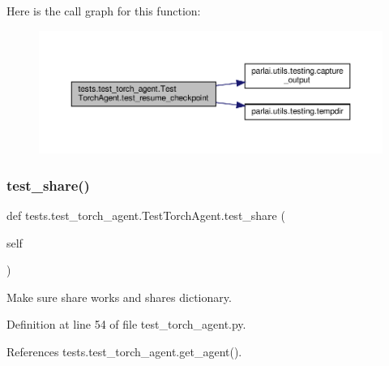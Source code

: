 Here is the call graph for this function\+:
\nopagebreak
\begin{figure}[H]
\begin{center}
\leavevmode
\includegraphics[width=350pt]{classtests_1_1test__torch__agent_1_1TestTorchAgent_a7135ee3421b1d0fc98f0202718910482_cgraph}
\end{center}
\end{figure}
\mbox{\label{classtests_1_1test__torch__agent_1_1TestTorchAgent_af3d1c7681a30a06684117464ccefb15d}} 
\subsubsection{\texorpdfstring{test\+\_\+share()}{test\_share()}}
{\footnotesize\ttfamily def tests.\+test\+\_\+torch\+\_\+agent.\+Test\+Torch\+Agent.\+test\+\_\+share (\begin{DoxyParamCaption}\item[{}]{self }\end{DoxyParamCaption})}

\begin{DoxyVerb}Make sure share works and shares dictionary.\end{DoxyVerb}
 

Definition at line 54 of file test\+\_\+torch\+\_\+agent.\+py.



References tests.\+test\+\_\+torch\+\_\+agent.\+get\+\_\+agent().

